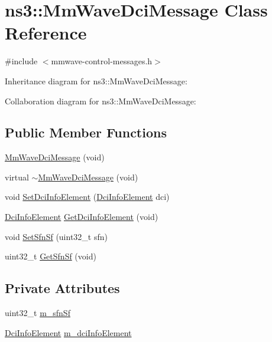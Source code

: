 \hypertarget{classns3_1_1MmWaveDciMessage}{}\section{ns3\+:\+:Mm\+Wave\+Dci\+Message Class Reference}
\label{classns3_1_1MmWaveDciMessage}


{\ttfamily \#include $<$mmwave-\/control-\/messages.\+h$>$}



Inheritance diagram for ns3\+:\+:Mm\+Wave\+Dci\+Message\+:


Collaboration diagram for ns3\+:\+:Mm\+Wave\+Dci\+Message\+:
\subsection*{Public Member Functions}
\begin{DoxyCompactItemize}
\item 
\hyperlink{classns3_1_1MmWaveDciMessage_acf340b6c0a8516e05218412f359bb4a4}{Mm\+Wave\+Dci\+Message} (void)
\item 
virtual \hyperlink{classns3_1_1MmWaveDciMessage_ad07a1f21f9a8f70e4d2d8803e32f3d12}{$\sim$\+Mm\+Wave\+Dci\+Message} (void)
\item 
void \hyperlink{classns3_1_1MmWaveDciMessage_ad70f104ffc3a6f28e755a2dd2643468d}{Set\+Dci\+Info\+Element} (\hyperlink{structns3_1_1DciInfoElement}{Dci\+Info\+Element} dci)
\item 
\hyperlink{structns3_1_1DciInfoElement}{Dci\+Info\+Element} \hyperlink{classns3_1_1MmWaveDciMessage_a4d386e23ef75a3d13c2b8d3f137baf80}{Get\+Dci\+Info\+Element} (void)
\item 
void \hyperlink{classns3_1_1MmWaveDciMessage_a074dbd8bd5d15035004d9f2c94629ee5}{Set\+Sfn\+Sf} (uint32\+\_\+t sfn)
\item 
uint32\+\_\+t \hyperlink{classns3_1_1MmWaveDciMessage_af10ef0fa551c6b55c91775daeb792d85}{Get\+Sfn\+Sf} (void)
\end{DoxyCompactItemize}
\subsection*{Private Attributes}
\begin{DoxyCompactItemize}
\item 
uint32\+\_\+t \hyperlink{classns3_1_1MmWaveDciMessage_aff0401c8bf30ba42a46fc369a32b0ce2}{m\+\_\+sfn\+Sf}
\item 
\hyperlink{structns3_1_1DciInfoElement}{Dci\+Info\+Element} \hyperlink{classns3_1_1MmWaveDciMessage_a1a940eabd5248a790d2a932f0bc6e03c}{m\+\_\+dci\+Info\+Element}
\end{DoxyCompactItemize}

